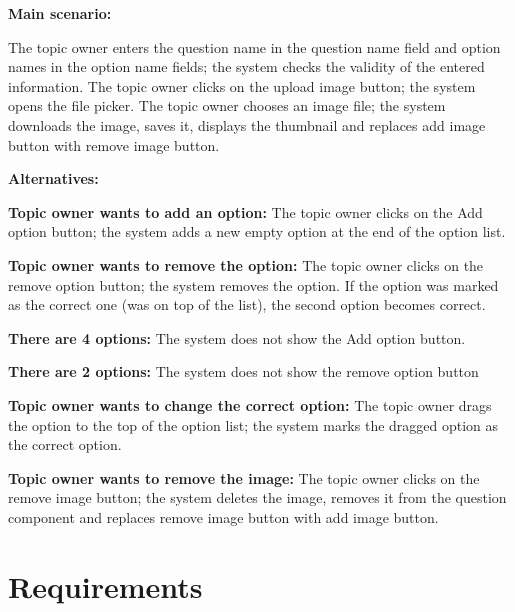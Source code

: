 \documentclass[
    english, %
]{VUMIFPSkursinis}
\begin{document}
\noindent\textbf{\fontsize{13}{15}\selectfont Main scenario:}

The topic owner enters the question name in the question name field and option names in the option name fields; the system checks the validity of the entered information. The topic owner clicks on the upload image button; the system opens the file picker. The topic owner chooses an image file; the system downloads the image, saves it, displays the thumbnail and replaces add image button with remove image button.

\noindent\textbf{\fontsize{13}{15}\selectfont Alternatives:}

\textbf{Topic owner wants to add an option:} The topic owner clicks on the Add option button; the system adds a new empty option at the end of the option list.

\textbf{Topic owner wants to remove the option:} The topic owner clicks on the remove option button; the system removes the option. If the option was marked as the correct one (was on top of the list), the second option becomes correct.

\textbf{There are 4 options:} The system does not show the Add option button.

\textbf{There are 2 options:} The system does not show the remove option button

\textbf{Topic owner wants to change the correct option:} The topic owner drags the option to the top of the option list; the system marks the dragged option as the correct option.

\textbf{Topic owner wants to remove the image:} The topic owner clicks on the remove image button; the system deletes the image, removes it from the question component and replaces remove image button with add image button.

\section{Requirements}
\end{document}
